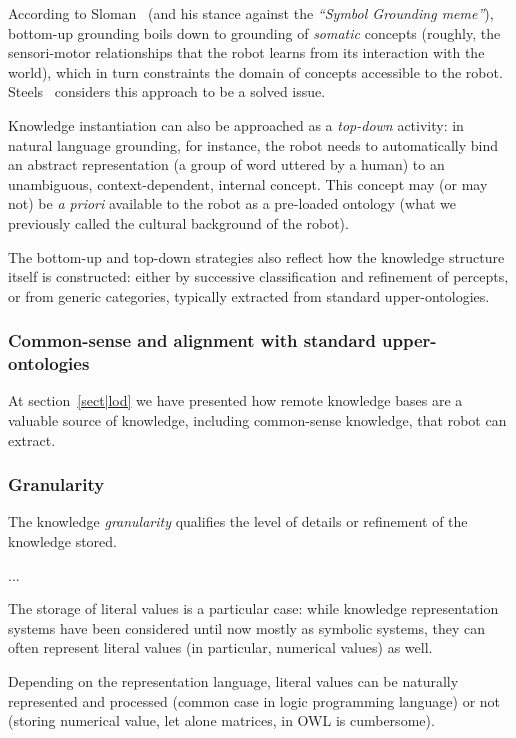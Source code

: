 According to Sloman~\cite{Sloman2007} (and his stance against the
\emph{``Symbol Grounding meme''}), bottom-up grounding boils down to grounding
of \emph{somatic} concepts (\ie roughly, the sensori-motor relationships that
the robot learns from its interaction with the world), which in turn
constraints the domain of concepts accessible to the robot.
Steels~\cite{Steels2007} considers this approach to be a solved issue.

Knowledge instantiation can also be approached as a \emph{top-down} activity:
in natural language grounding, for instance, the robot needs to automatically
bind an abstract representation (a group of word uttered by a human) to an
unambiguous, context-dependent, internal concept. This concept may (or may not)
be \textit{a priori} available to the robot as a pre-loaded ontology (what we
previously called the cultural background of the robot).

The bottom-up and top-down strategies also reflect how the knowledge structure
itself is constructed: either by successive classification and refinement of
percepts, or from generic categories, typically extracted from standard
upper-ontologies.

\subsubsection{Common-sense and alignment with standard upper-ontologies}

At section~\ref{sect|lod} we have presented how remote knowledge bases are a
valuable source of knowledge, including common-sense knowledge, that robot can
extract.

\subsubsection{Granularity}

The knowledge \emph{granularity} qualifies the level of details or refinement
of the knowledge stored.

...

The storage of literal values is a particular case: while knowledge
representation systems have been considered until now mostly as symbolic
systems, they can often represent literal values (in particular, numerical
values) as well.

Depending on the representation language, literal values can be naturally
represented and processed (common case in logic programming language) or not
(storing numerical value, let alone matrices, in OWL is cumbersome).

